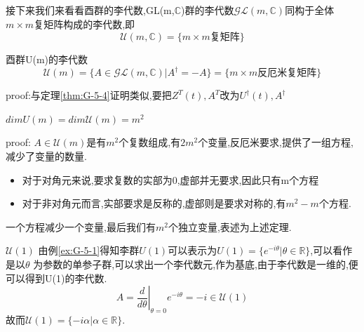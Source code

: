 \documentclass[../main.tex]{subfiles}
\begin{document}
 接下来我们来看看酉群的李代数,GL(m,$\mathbb{C}$)群的李代数$\mathscr{GL}(m,\mathbb{C})$同构于全体$m\times m$复矩阵构成的李代数,即
 $$\mathscr{U}(m,\mathbb{C}) = \{m\times m \text{复矩阵}\}$$
 \begin{theorem}
     酉群U(m)的李代数
     $$\mathscr{U}(m) = \{A \in \mathscr{GL}(m,\mathbb{C})|A^\dagger = -A\} = \{m\times m \text{反厄米复矩阵}\}$$
 \end{theorem}
 proof:与定理\ref{thm:G-5-4}证明类似,要把$Z^T(t),A^T$改为$U^\dagger(t),A^\dagger$
 \begin{theorem}{}{}
    \centering $dimU(m)=dim\mathscr{U}(m)=m^2$
 \end{theorem}
 proof: $A\in \mathscr{U}(m)$是有$m^2$个复数组成,有$2m^2$个变量,反厄米要求,提供了一组方程,减少了变量的数量.
 \begin{itemize}
     \item 对于对角元来说,要求复数的实部为0,虚部并无要求,因此只有m个方程
     \item 对于非对角元而言,实部要求是反称的,虚部则是要求对称的,有$m^2 - m$个方程.
 \end{itemize}
 一个方程减少一个变量,最后我们有$m^2$个独立变量,表述为上述定理.
 \begin{example}{$\mathscr{U}(1)$}
   \label{G-5-2}
    由例\ref{ex:G-5-1}得知李群$U(1)$可以表示为$U(1) = \{e^{-i\theta}|\theta \in \mathbb{R}\}$,可以看作是以$\theta$
    为参数的单参子群,可以求出一个李代数元,作为基底,由于李代数是一维的,便可以得到U(1)的李代数.
    $$A = \left.\frac{d}{d\theta}\right|_{\theta = 0} e^{-i \theta} = -i \in \mathscr{U}(1)$$
    故而$\mathscr{U}(1) = \{-i\alpha|\alpha \in \mathbb{R}\}$.
 \end{example}
\end{document}
